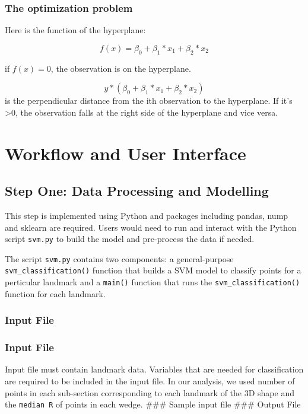 \documentclass[10pt,letterpaper]{article}
\begin{document}
\subsubsection{The optimization problem}\label{the-optimization-problem}

Here is the function of the hyperplane:

\[f(x) = \beta_0 + \beta_1 * x_1 + \beta_2 * x_2 \]

if \(f(x) = 0\), the observation is on the hyperplane.

\[ y * ( \beta_0 + \beta_1 * x_1 + \beta_2 * x_2 )\] is the
perpendicular distance from the ith observation to the hyperplane. If
it's \textgreater{}0, the observation falls at the right side of the
hyperplane and vice versa.

\section{Workflow and User Interface}\label{workflow-and-user-interface}

\subsection{Step One: Data Processing and
Modelling}\label{step-one-data-processing-and-modelling}

This step is implemented using Python and packages including pandas,
nump and sklearn are required. Users would need to run and interact with
the Python script \texttt{svm.py} to build the model and pre-process the
data if needed.

The script \texttt{svm.py} contains two components: a general-purpose
\texttt{svm\_classification()} function that builds a SVM model to
classify points for a perticular landmark and a \texttt{main()} function
that runs the \texttt{svm\_classification()} function for each landmark.

\subsubsection{Input File}\label{input-file}

\subsubsection{Input File}\label{input-file-1}

Input file must contain landmark data. Variables that are needed for
classification are required to be included in the input file. In our
analysis, we used number of points in each sub-section corresponding to
each landmark of the 3D shape and the \texttt{median\ R} of points in
each wedge. \#\#\# Sample input file \#\#\# Output File
\end{document}
